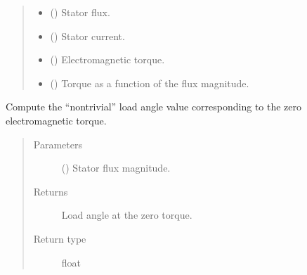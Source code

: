\documentclass[letterpaper,10pt,english]{sphinxmanual}
\begin{document}
\begin{fulllineitems}
\begin{fulllineitems}
\begin{quote}
\begin{description}
\begin{itemize}
\item {} 
\sphinxAtStartPar
{} () \textendash{} Stator flux.

\item {} 
\sphinxAtStartPar
{} () \textendash{} Stator current.

\item {} 
\sphinxAtStartPar
{} () \textendash{} Electromagnetic torque.

\item {} 
\sphinxAtStartPar
{} () \textendash{} Torque as a function of the flux magnitude.

\end{itemize}


\end{description}\end{quote}

\end{fulllineitems}


\begin{fulllineitems}
\label{\detokenize{control.sm:control.sm.torque.TorqueCharacteristics.delta_at_zero_torque}}
\pysigstartsignatures
{}
\pysigstopsignatures
\sphinxAtStartPar
Compute the “nontrivial” load angle value corresponding to the zero
electromagnetic torque.
\begin{quote}\begin{description}
\item[{Parameters}] \leavevmode
\sphinxAtStartPar
{} () \textendash{} Stator flux magnitude.

\item[{Returns}] \leavevmode
\sphinxAtStartPar
{} \textendash{} Load angle at the zero torque.

\item[{Return type}] \leavevmode
\sphinxAtStartPar
float

\end{description}\end{quote}


\end{fulllineitems}
\end{fulllineitems}
\end{document}
